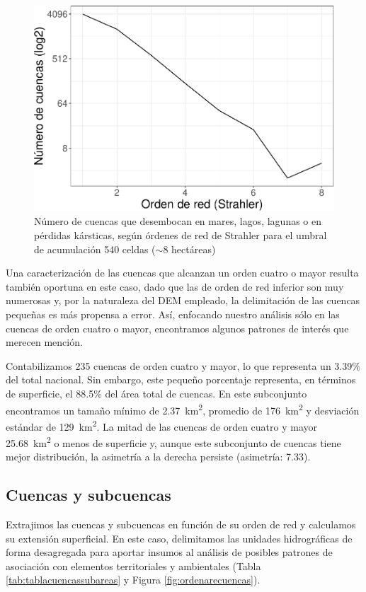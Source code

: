 \documentclass[spanish]{article}
\begin{document}
\begin{figure}

{\centering \includegraphics[width=0.6\linewidth]{preprint_files/figure-latex/ordennumcuencas-1} 

}

\caption{Número de cuencas que desembocan en mares, lagos, lagunas o en pérdidas kársticas, según órdenes de red de Strahler para el umbral de acumulación 540 celdas ($\sim$8 hectáreas)}\label{fig:ordennumcuencas}
\end{figure}

Una caracterización de las cuencas que alcanzan un orden cuatro o mayor
resulta también oportuna en este caso, dado que las de orden de red
inferior son muy numerosas y, por la naturaleza del DEM empleado, la
delimitación de las cuencas pequeñas es más propensa a error. Así,
enfocando nuestro análisis sólo en las cuencas de orden cuatro o mayor,
encontramos algunos patrones de interés que merecen mención.

Contabilizamos 235 cuencas de orden cuatro y mayor, lo que representa un
3.39\% del total nacional. Sin embargo, este pequeño porcentaje
representa, en términos de superficie, el 88.5\% del área total de
cuencas. En este subconjunto encontramos un tamaño mínimo de
2.37~km\textsuperscript{2}, promedio de 176~km\textsuperscript{2} y
desviación estándar de 129~km\textsuperscript{2}. La mitad de las
cuencas de orden cuatro y mayor 25.68~km\textsuperscript{2} o menos de
superficie y, aunque este subconjunto de cuencas tiene mejor
distribución, la asimetría a la derecha persiste (asimetría: 7.33).

\hypertarget{cuencas-y-subcuencas}{%
\subsection{Cuencas y subcuencas}\label{cuencas-y-subcuencas}}

Extrajimos las cuencas y subcuencas en función de su orden de red y
calculamos su extensión superficial. En este caso, delimitamos las
unidades hidrográficas de forma desagregada para aportar insumos al
análisis de posibles patrones de asociación con elementos territoriales
y ambientales (Tabla \ref{tab:tablacuencassubareas} y Figura
\ref{fig:ordenarecuencas}).
\end{document}
